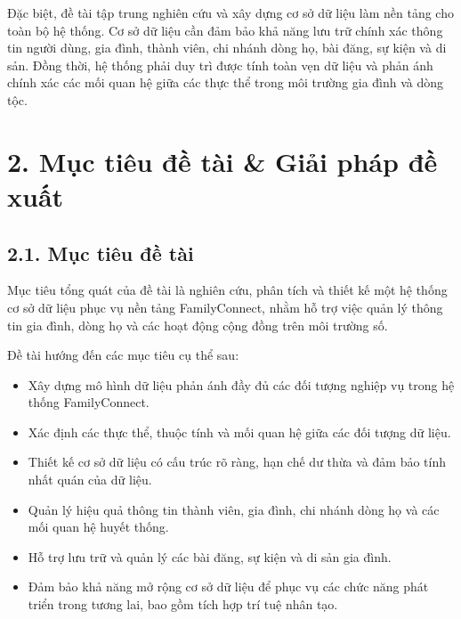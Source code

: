 Đặc biệt, đề tài tập trung nghiên cứu và xây dựng cơ sở dữ liệu làm nền tảng cho toàn bộ hệ thống. Cơ sở dữ liệu cần đảm bảo khả năng lưu trữ chính xác thông tin người dùng, gia đình, thành viên, chi nhánh dòng họ, bài đăng, sự kiện và di sản. Đồng thời, hệ thống phải duy trì được tính toàn vẹn dữ liệu và phản ánh chính xác các mối quan hệ giữa các thực thể trong môi trường gia đình và dòng tộc.


\section*{2. Mục tiêu đề tài \& Giải pháp đề xuất}
{}

\subsection*{2.1. Mục tiêu đề tài}
{}

Mục tiêu tổng quát của đề tài là nghiên cứu, phân tích và thiết kế một hệ thống cơ sở dữ liệu phục vụ nền tảng FamilyConnect, nhằm hỗ trợ việc quản lý thông tin gia đình, dòng họ và các hoạt động cộng đồng trên môi trường số.

Đề tài hướng đến các mục tiêu cụ thể sau:

\begin{itemize}[leftmargin=*]
\item Xây dựng mô hình dữ liệu phản ánh đầy đủ các đối tượng nghiệp vụ trong hệ thống FamilyConnect.
\item Xác định các thực thể, thuộc tính và mối quan hệ giữa các đối tượng dữ liệu.
\item Thiết kế cơ sở dữ liệu có cấu trúc rõ ràng, hạn chế dư thừa và đảm bảo tính nhất quán của dữ liệu.
\item Quản lý hiệu quả thông tin thành viên, gia đình, chi nhánh dòng họ và các mối quan hệ huyết thống.
\item Hỗ trợ lưu trữ và quản lý các bài đăng, sự kiện và di sản gia đình.
\item Đảm bảo khả năng mở rộng cơ sở dữ liệu để phục vụ các chức năng phát triển trong tương lai, bao gồm tích hợp trí tuệ nhân tạo.
\end{itemize}

